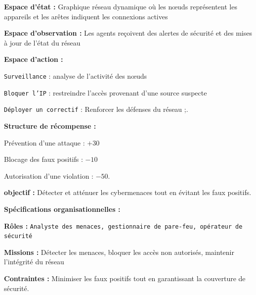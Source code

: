 \begin{enumerate*}[label={\roman*)}, itemjoin={; \quad}]
  \item \textbf{Espace d'état :} Graphique réseau dynamique où les nœuds représentent les appareils et les arêtes indiquent les connexions actives
  \item \textbf{Espace d'observation :} Les agents reçoivent des alertes de sécurité et des mises à jour de l'état du réseau
  \item \textbf{Espace d'action :}
  \begin{enumerate*}[label={\roman*)}, itemjoin={; \quad}]
    \item \texttt{Surveillance} : analyse de l'activité des nœuds
    \item \texttt{Bloquer l'IP} : restreindre l'accès provenant d'une source suspecte
    \item \texttt{Déployer un correctif} : Renforcer les défenses du réseau ;.
  \end{enumerate*}
  \item \textbf{Structure de récompense :}
  \begin{enumerate*}[label={\roman*)}, itemjoin={; \quad}]
    \item Prévention d'une attaque : $+30$
    \item Blocage des faux positifs : $-10$
    \item Autorisation d'une violation : $-50$.
  \end{enumerate*}
  \item \textbf{objectif :} Détecter et atténuer les cybermenaces tout en évitant les faux positifs.
\end{enumerate*}
%
\textbf{Spécifications organisationnelles :}
\begin{enumerate*}[label={\roman*)}, itemjoin={; \quad}]
  \item \textbf{Rôles :} \texttt{Analyste des menaces, gestionnaire de pare-feu, opérateur de sécurité}
  \item \textbf{Missions :} Détecter les menaces, bloquer les accès non autorisés, maintenir l'intégrité du réseau
  \item \textbf{Contraintes :} Minimiser les faux positifs tout en garantissant la couverture de sécurité.
\end{enumerate*}

